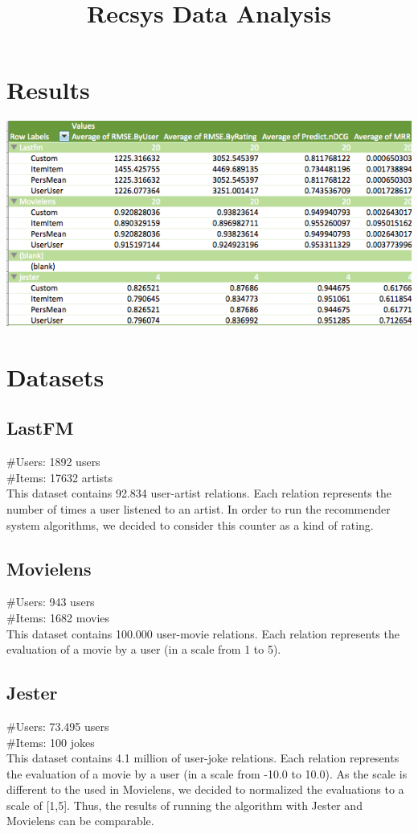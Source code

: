 \documentclass[a4paper]{article}
\title{Recsys Data Analysis}
\begin{document}
\maketitle
\section{Results}

\includegraphics[scale=0.75]{Tabla.png}


\section{Datasets}
\subsection{LastFM}
\#Users: 1892 users \\
\#Items: 17632 artists \\
This dataset contains 92.834 user-artist relations. Each relation represents the number of times a user listened to an artist. In order to run the recommender system algorithms, we decided to consider this counter as a kind of rating.

\subsection{Movielens}
\#Users: 943 users \\
\#Items: 1682  movies \\
This dataset contains 100.000 user-movie relations. Each relation represents the evaluation of a movie by a user (in a scale from 1 to 5).

\subsection{Jester}
\#Users: 73.495 users \\
\#Items: 100 jokes \\
This dataset contains 4.1 million of user-joke relations. Each relation represents the evaluation of a movie by a user (in a scale from -10.0 to 10.0). As the scale is different to the used in Movielens, we decided to normalized the evaluations to a scale of [1,5]. Thus, the results of running the algorithm with Jester and Movielens can be comparable.
\end{document}
